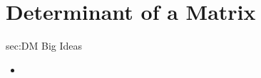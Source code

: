 \chapter{Determinant of a Matrix}
\label{chap:DM}

\begin{bigideas}{sec:DM Big Ideas}
\begin{itemize}
  \item 
\end{itemize}
\end{bigideas}